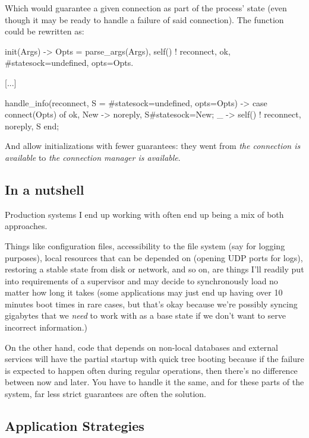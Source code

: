 \documentclass[11pt, oneside]{book}   	%
\begin{document}
Which would guarantee a given connection as part of the process' state (even though it may be ready to handle a failure of said connection). The function could be rewritten as:

\begin{VerbatimText}
init(Args) ->
    Opts = parse_args(Args),
    self() ! reconnect,
    {ok, #state{sock=undefined, opts=Opts}}.

[...]

handle_info(reconnect, S = #state{sock=undefined, opts=Opts}) ->
    case connect(Opts) of
        {ok, New} -> {noreply, S#state{sock=New}};
        _ -> self() ! reconnect, {noreply, S}
    end;
\end{VerbatimText}

And allow initializations with fewer guarantees: they went from \emph{the connection is available} to \emph{the connection manager is available}.

\subsection{In a nutshell}
\label{subsec:start-link-in-a-nutshell}

Production systems I end up working with often end up being a mix of both approaches.

Things like configuration files, accessibility to the file system (say for logging purposes), local resources that can be depended on (opening UDP ports for logs), restoring a stable state from disk or network, and so on, are things I'll readily put into requirements of a supervisor and may decide to synchronously load no matter how long it takes (some applications may just end up having over 10 minutes boot times in rare cases, but that's okay because we're possibly syncing gigabytes that we \emph{need} to work with as a base state if we don't want to serve incorrect information.)

On the other hand, code that depends on non-local databases and external services will have the partial startup with quick tree booting because if the failure is expected to happen often during regular operations,
then there's no difference between now and later. You have to handle it the same, and for these parts of the system, far less strict guarantees are often the solution.

\subsection{Application Strategies}
\label{subsec:start-link-application-strategies}
\end{document}
